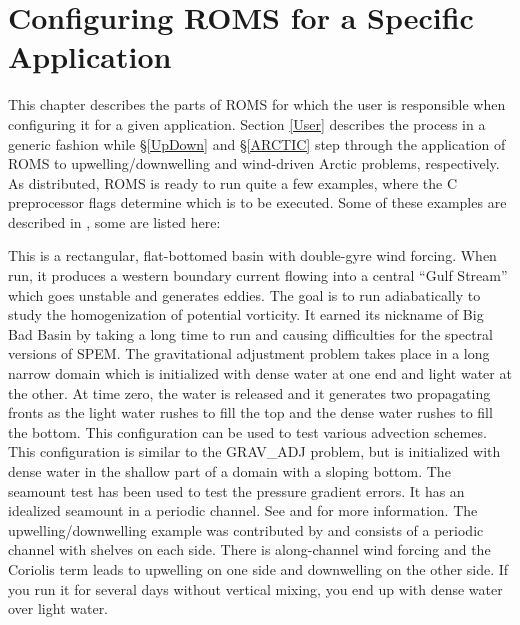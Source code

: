 \section{Configuring ROMS for a Specific Application}
\label{Wave}
This chapter describes the parts of ROMS for which the user is
responsible when configuring it for a given application.  Section
\ref{User} describes the process in a generic fashion while
\S\ref{UpDown} and \S\ref{ARCTIC} step through the application of ROMS
to upwelling/downwelling and wind-driven Arctic problems,
respectively.  As distributed, ROMS is ready to run quite a few
examples, where the C preprocessor flags determine which is to be
executed.  Some of these examples are described in
\citet{Haidvogel99}, some are listed here:
\begin{klist}
    This is a rectangular, flat-bottomed basin with
 double-gyre wind forcing. When run, it produces a western boundary
 current flowing into a central ``Gulf Stream''
 which goes unstable and generates eddies. The goal is to run
 adiabatically to study the homogenization of potential vorticity.
 It earned its nickname of Big Bad Basin by taking a long time to
 run and causing difficulties for the spectral versions of SPEM.
    The gravitational adjustment problem takes place
 in a long narrow domain which is initialized with dense water at one
 end and light water at the other. At time zero, the water is released
 and it generates two propagating fronts as the light water rushes to
 fill the top and the dense water rushes to fill the bottom. This
 configuration can be used to test various advection schemes.
      This configuration is similar to the
 GRAV\_ADJ problem, but is initialized with dense water in the shallow
part of a domain with a sloping bottom.
      The seamount test has been used to test the pressure
 gradient errors.  It has an idealized seamount in a periodic channel.
 See \citet{BH93} and \citet{McCalpin94} for more information.
     The upwelling/downwelling example was
 contributed by \citet{Macks93}
 and consists of a periodic channel with shelves on each side.
 There is along-channel wind forcing and the Coriolis term leads
 to upwelling on one side and downwelling on the other side. If
 you run it for several days without vertical mixing, you end up with
 dense water over light water.
\end{klist}
